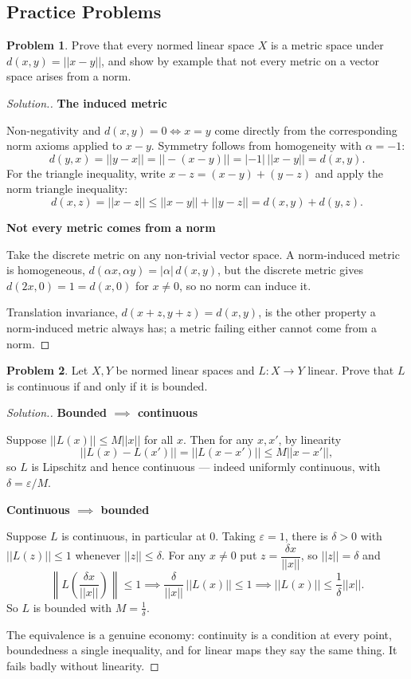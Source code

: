 \documentclass[11pt,a4paper]{article}
\theoremstyle{definition}
\newtheorem{problemx}{Problem}[section]
\newenvironment{problem}{\begin{problemx}}{\end{problemx}}
\newenvironment{solution}
  {\renewcommand{\qedsymbol}{}\begin{proof}[\textit{Solution}.]}
  {\end{proof}}
\newcommand{\subhead}[1]{%
  \par\medskip\noindent\textbf{#1}\par\nobreak\smallskip}
\begin{document}
\subsection{Practice Problems}

\begin{problem}
Prove that every normed linear space $X$ is a metric space under
$d(x,y)=||x-y||$, and show by example that not every metric on a vector space
arises from a norm.
\end{problem}
\begin{solution}
\subhead{The induced metric}
Non-negativity and $d(x,y)=0\iff x=y$ come directly from the corresponding
norm axioms applied to $x-y$. Symmetry follows from homogeneity with
$\alpha=-1$:
$$d(y,x)=||y-x||=||-(x-y)||=|-1|\,||x-y||=d(x,y).$$
For the triangle inequality, write $x-z=(x-y)+(y-z)$ and apply the norm
triangle inequality:
$$d(x,z)=||x-z||\leq||x-y||+||y-z||=d(x,y)+d(y,z).$$

\subhead{Not every metric comes from a norm}
Take the discrete metric on any non-trivial vector space. A norm-induced metric
is homogeneous, $d(\alpha x,\alpha y)=|\alpha|\,d(x,y)$, but the discrete
metric gives $d(2x,0)=1=d(x,0)$ for $x\neq 0$, so no norm can induce it.

Translation invariance, $d(x+z,y+z)=d(x,y)$, is the other property a
norm-induced metric always has; a metric failing either cannot come from a
norm.
\end{solution}

\begin{problem}
Let $X,Y$ be normed linear spaces and $L:X\rightarrow Y$ linear. Prove that $L$
is continuous if and only if it is bounded.
\end{problem}
\begin{solution}
\subhead{Bounded $\implies$ continuous}
Suppose $||L(x)||\leq M||x||$ for all $x$. Then for any $x,x'$, by linearity
$$||L(x)-L(x')||=||L(x-x')||\leq M||x-x'|| ,$$
so $L$ is Lipschitz and hence continuous --- indeed uniformly continuous, with
$\delta=\varepsilon/M$.

\subhead{Continuous $\implies$ bounded}
Suppose $L$ is continuous, in particular at $0$. Taking $\varepsilon=1$, there
is $\delta>0$ with $||L(z)||\leq 1$ whenever $||z||\leq\delta$. For any
$x\neq 0$ put $z=\dfrac{\delta x}{||x||}$, so $||z||=\delta$ and
$$\left\|L\!\left(\frac{\delta x}{||x||}\right)\right\|\leq 1
\implies \frac{\delta}{||x||}\,||L(x)||\leq 1
\implies ||L(x)||\leq\frac{1}{\delta}||x|| .$$
So $L$ is bounded with $M=\frac1\delta$.

The equivalence is a genuine economy: continuity is a condition at every point,
boundedness a single inequality, and for linear maps they say the same thing.
It fails badly without linearity.
\end{solution}
\end{document}
